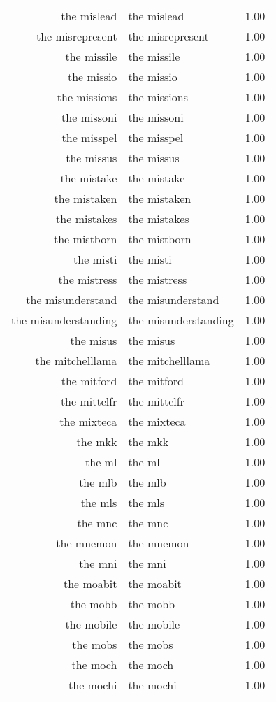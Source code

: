 \begin{table}[ht]
\begin{tabular}{rlr}
  the mislead & the mislead & 1.00 \\ 
  the misrepresent & the misrepresent & 1.00 \\ 
  the missile & the missile & 1.00 \\ 
  the missio & the missio & 1.00 \\ 
  the missions & the missions & 1.00 \\ 
  the missoni & the missoni & 1.00 \\ 
  the misspel & the misspel & 1.00 \\ 
  the missus & the missus & 1.00 \\ 
  the mistake & the mistake & 1.00 \\ 
  the mistaken & the mistaken & 1.00 \\ 
  the mistakes & the mistakes & 1.00 \\ 
  the mistborn & the mistborn & 1.00 \\ 
  the misti & the misti & 1.00 \\ 
  the mistress & the mistress & 1.00 \\ 
  the misunderstand & the misunderstand & 1.00 \\ 
  the misunderstanding & the misunderstanding & 1.00 \\ 
  the misus & the misus & 1.00 \\ 
  the mitchelllama & the mitchelllama & 1.00 \\ 
  the mitford & the mitford & 1.00 \\ 
  the mittelfr & the mittelfr & 1.00 \\ 
  the mixteca & the mixteca & 1.00 \\ 
  the mkk & the mkk & 1.00 \\ 
  the ml & the ml & 1.00 \\ 
  the mlb & the mlb & 1.00 \\ 
  the mls & the mls & 1.00 \\ 
  the mnc & the mnc & 1.00 \\ 
  the mnemon & the mnemon & 1.00 \\ 
  the mni & the mni & 1.00 \\ 
  the moabit & the moabit & 1.00 \\ 
  the mobb & the mobb & 1.00 \\ 
  the mobile & the mobile & 1.00 \\ 
  the mobs & the mobs & 1.00 \\ 
  the moch & the moch & 1.00 \\ 
  the mochi & the mochi & 1.00 \\ 

\end{tabular}
\end{table}
